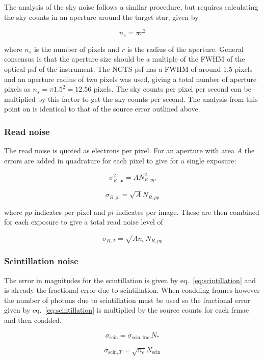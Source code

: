 \documentclass[a4paper]{report}
\begin{document}
The analysis of the sky noise follows a similar procedure, but requires
calculating the sky counts in an aperture around the target star, given
by

\[
    n_{s} = \pi r^2
    \]

where $n_s$ is the number of pixels and $r$ is the radius of the
aperture. General consensus is that the aperture size should be a
multiple of the FWHM of the optical psf of the instrument. The NGTS psf
has a FWHM of around 1.5 pixels and an aperture radius of two pixels was
used, giving a total number of aperture pixels as $n_s = \pi 1.5^2 =
12.56$ pixels. The sky counts per pixel per second can be multiplied by
this factor to get the sky counts per second. The analysis from this
point on is identical to that of the source error outlined above.

\subsubsection{Read noise}

The read noise is quoted as electrons per pixel. For an aperture with
area $A$ the errors are added in quadrature for each pixel to give for a
single exposure:

\[
    \sigma_{R,\mathrm{pi}}^2 = A N_{R,pp}^2
    \]

\[
    \sigma_{R,\mathrm{pi}} = \sqrt{A} N_{R,pp}
\]

where $pp$ indicates per pixel and $pi$ indicates per image. These 
are then combined for each exposure to give a total read noise 
level of 

\[
    \sigma_{R,T} = \sqrt{A n_e} N_{R,pp}
    \]


\subsubsection{Scintillation noise}

The error in magnitudes for the scintillation is given by
eq.~\ref{eq:scintillation} and is already the fractional error due to
scintillation. When coadding frames however the number of photons due to
scintillation must be used so the fractional error given by
eq.~\ref{eq:scintillation} is multiplied by the source counts for each
frmae and then coadded.

\[
    \sigma_{\mathrm{scin}} = \sigma_{\mathrm{scin},\mathrm{frac}} N_{\ast}
    \]

\[
    \sigma_{\mathrm{scin},T} = \sqrt{n_e} N_{\mathrm{scin}} 
\]
\end{document}
